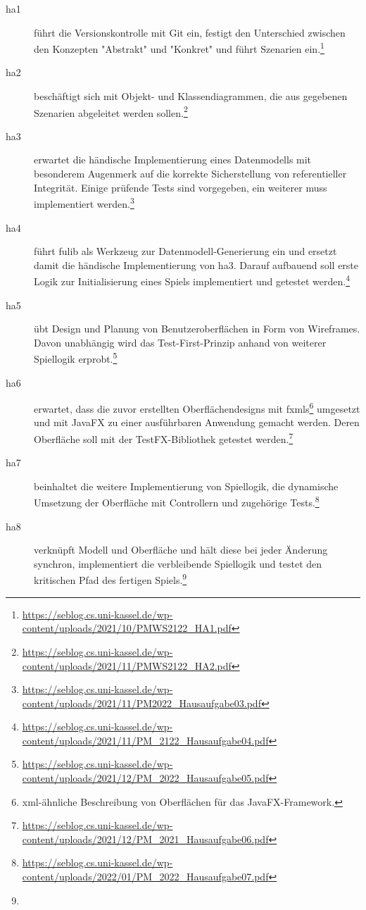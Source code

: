 \begin{description}
    \item[\ac{ha}1] führt die Versionskontrolle mit Git ein, festigt den Unterschied zwischen den Konzepten "Abstrakt" und "Konkret" und führt Szenarien ein.\footnote{
        \url{https://seblog.cs.uni-kassel.de/wp-content/uploads/2021/10/PMWS2122_HA1.pdf}
    }
    \item[\ac{ha}2] beschäftigt sich mit Objekt- und Klassendiagrammen, die aus gegebenen Szenarien abgeleitet werden sollen.\footnote{
        \url{https://seblog.cs.uni-kassel.de/wp-content/uploads/2021/11/PMWS2122_HA2.pdf}
    }
    \item[\ac{ha}3] erwartet die händische Implementierung eines Datenmodells mit besonderem Augenmerk auf die korrekte Sicherstellung von referentieller Integrität.
    Einige prüfende Tests sind vorgegeben, ein weiterer muss implementiert werden.\footnote{
        \url{https://seblog.cs.uni-kassel.de/wp-content/uploads/2021/11/PM2022_Hausaufgabe03.pdf}
    }
    \item[\ac{ha}4] führt fulib als Werkzeug zur Datenmodell-Generierung ein und ersetzt damit die händische Implementierung von \ac{ha}3.
    Darauf aufbauend soll erste Logik zur Initialisierung eines Spiels implementiert und getestet werden.\footnote{
        \url{https://seblog.cs.uni-kassel.de/wp-content/uploads/2021/11/PM_2122_Hausaufgabe04.pdf}
    }
    \item[\ac{ha}5] übt Design und Planung von Benutzeroberflächen in Form von Wireframes.
    Davon unabhängig wird das Test-First-Prinzip anhand von weiterer Spiellogik erprobt.\footnote{
        \url{https://seblog.cs.uni-kassel.de/wp-content/uploads/2021/12/PM_2022_Hausaufgabe05.pdf}
    }
    \item[\ac{ha}6] erwartet, dass die zuvor erstellten Oberflächendesigns mit \acp{fxml}\footnote{
        \ac{xml}-ähnliche Beschreibung von Oberflächen für das JavaFX-Framework.
    } umgesetzt und mit JavaFX zu einer ausführbaren Anwendung gemacht werden.
    Deren Oberfläche soll mit der TestFX-Bibliothek getestet werden.\footnote{
        \url{https://seblog.cs.uni-kassel.de/wp-content/uploads/2021/12/PM_2021_Hausaufgabe06.pdf}
    }
    \item[\ac{ha}7] beinhaltet die weitere Implementierung von Spiellogik, die dynamische Umsetzung der Oberfläche mit Controllern und zugehörige Tests.\footnote{
        \url{https://seblog.cs.uni-kassel.de/wp-content/uploads/2022/01/PM_2022_Hausaufgabe07.pdf}
    }
    \item[\ac{ha}8] verknüpft Modell und Oberfläche und hält diese bei jeder Änderung synchron, implementiert die verbleibende Spiellogik und testet den kritischen Pfad des fertigen Spiels.\footnote{
}
\end{description}
